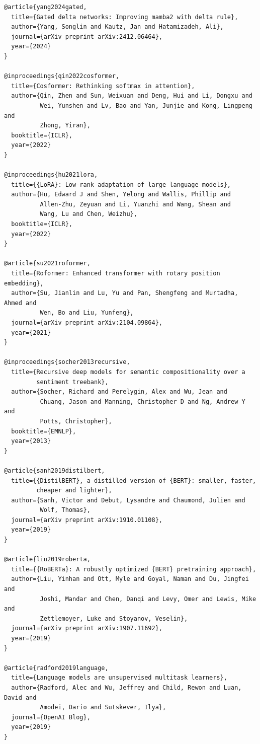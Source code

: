 \begin{lstlisting}
@article{yang2024gated,
  title={Gated delta networks: Improving mamba2 with delta rule},
  author={Yang, Songlin and Kautz, Jan and Hatamizadeh, Ali},
  journal={arXiv preprint arXiv:2412.06464},
  year={2024}
}

@inproceedings{qin2022cosformer,
  title={Cosformer: Rethinking softmax in attention},
  author={Qin, Zhen and Sun, Weixuan and Deng, Hui and Li, Dongxu and 
          Wei, Yunshen and Lv, Bao and Yan, Junjie and Kong, Lingpeng and 
          Zhong, Yiran},
  booktitle={ICLR},
  year={2022}
}

@inproceedings{hu2021lora,
  title={{LoRA}: Low-rank adaptation of large language models},
  author={Hu, Edward J and Shen, Yelong and Wallis, Phillip and 
          Allen-Zhu, Zeyuan and Li, Yuanzhi and Wang, Shean and 
          Wang, Lu and Chen, Weizhu},
  booktitle={ICLR},
  year={2022}
}

@article{su2021roformer,
  title={Roformer: Enhanced transformer with rotary position embedding},
  author={Su, Jianlin and Lu, Yu and Pan, Shengfeng and Murtadha, Ahmed and 
          Wen, Bo and Liu, Yunfeng},
  journal={arXiv preprint arXiv:2104.09864},
  year={2021}
}

@inproceedings{socher2013recursive,
  title={Recursive deep models for semantic compositionality over a 
         sentiment treebank},
  author={Socher, Richard and Perelygin, Alex and Wu, Jean and 
          Chuang, Jason and Manning, Christopher D and Ng, Andrew Y and 
          Potts, Christopher},
  booktitle={EMNLP},
  year={2013}
}

@article{sanh2019distilbert,
  title={{DistilBERT}, a distilled version of {BERT}: smaller, faster, 
         cheaper and lighter},
  author={Sanh, Victor and Debut, Lysandre and Chaumond, Julien and 
          Wolf, Thomas},
  journal={arXiv preprint arXiv:1910.01108},
  year={2019}
}

@article{liu2019roberta,
  title={{RoBERTa}: A robustly optimized {BERT} pretraining approach},
  author={Liu, Yinhan and Ott, Myle and Goyal, Naman and Du, Jingfei and 
          Joshi, Mandar and Chen, Danqi and Levy, Omer and Lewis, Mike and 
          Zettlemoyer, Luke and Stoyanov, Veselin},
  journal={arXiv preprint arXiv:1907.11692},
  year={2019}
}

@article{radford2019language,
  title={Language models are unsupervised multitask learners},
  author={Radford, Alec and Wu, Jeffrey and Child, Rewon and Luan, David and 
          Amodei, Dario and Sutskever, Ilya},
  journal={OpenAI Blog},
  year={2019}
}
\end{lstlisting}

